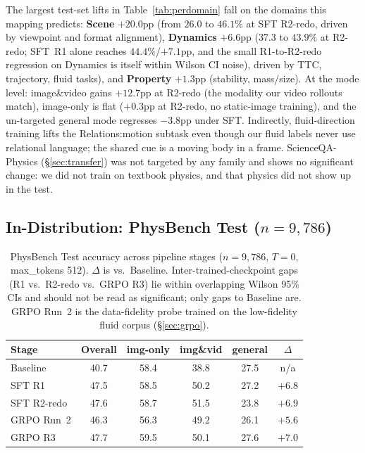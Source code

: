 \documentclass{article}
\begin{document}
The largest test-set lifts in Table~\ref{tab:perdomain} fall on the
domains this mapping predicts: \textbf{Scene} $+20.0$pp (from $26.0$
to $46.1\%$ at SFT R2-redo, driven by viewpoint and format alignment),
\textbf{Dynamics} $+6.6$pp ($37.3$ to $43.9\%$ at R2-redo;
SFT~R1 alone reaches $44.4\%$/${+}7.1$pp, and the small
R1-to-R2-redo regression on Dynamics is itself within Wilson CI noise), driven by
TTC, trajectory, fluid tasks), and \textbf{Property} $+1.3$pp
(stability, mass/size). At the mode level: image\&video gains
$+12.7$pp at R2-redo (the modality our video rollouts match),
image-only is flat ($+0.3$pp at R2-redo, no static-image training),
and the un-targeted general mode regresses $-3.8$pp under SFT.
Indirectly, fluid-direction training lifts the Relations:motion
subtask even though our fluid labels never use relational language;
the shared cue is a moving body in a frame. ScienceQA-Physics
(\S\ref{sec:transfer}) was not targeted by any family and shows no
significant change: we did not train on textbook physics, and that
physics did not show up in the test.

\subsection{In-Distribution: PhysBench Test ($n{=}9{,}786$)}

\begin{table}[t]
\caption{PhysBench Test accuracy across pipeline stages
($n{=}9{,}786$, $T{=}0$, max\_tokens 512). $\Delta$ is vs.\ Baseline.
Inter-trained-checkpoint gaps (R1 vs.\ R2-redo vs.\ GRPO R3) lie
within overlapping Wilson 95\% CIs and should not be read as
significant; only gaps to Baseline are. GRPO Run~2 is the
data-fidelity probe trained on the low-fidelity fluid corpus
(\S\ref{sec:grpo}).}
\label{tab:ablation}
\centering
\footnotesize
\setlength{\tabcolsep}{4pt}
\begin{tabular}{lccccc}
\toprule
Stage & Overall & img-only & img\&vid & general & $\Delta$ \\
\midrule
Baseline      & 40.7 & 58.4 & 38.8 & 27.5 & n/a \\
SFT R1        & 47.5 & 58.5 & 50.2 & 27.2 & $+6.8$ \\
SFT R2-redo   & 47.6 & 58.7 & 51.5 & 23.8 & $+6.9$ \\
GRPO Run~2    & 46.3 & 56.3 & 49.2 & 26.1 & $+5.6$ \\
GRPO R3       & 47.7 & 59.5 & 50.1 & 27.6 & $+7.0$ \\
\bottomrule
\end{tabular}
\end{table}
\end{document}
